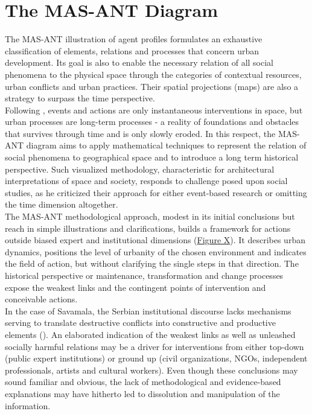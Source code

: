 \documentclass[11pt]{report}
\begin{document}
{{{\section{The MAS-ANT Diagram}

The MAS-ANT illustration of agent profiles formulates an exhaustive classification of elements, relations and processes that concern urban development.
Its goal is also to enable the necessary relation of all social phenomena to the physical space through the categories of contextual resources, urban conflicts and urban practices.
Their spatial projections (maps) are also a strategy to surpass the time perspective.
\\

Following \href{Braudel}{\cite{braudel_history_1970}}, events and actions are only instantaneous interventions in space, but urban processes are long-term processes - a reality of foundations and obstacles that survives through time and is only slowly eroded.
In this respect, the MAS-ANT diagram aims to apply mathematical  techniques to represent the  relation of social phenomena  to  geographical space and to introduce a  long term historical perspective.
Such visualized methodology, characteristic for architectural interpretations of space and society, responds to \href{Braudel}{\cite{braudel_history_1970}} challenge posed upon social studies, as he criticized their approach for either event-based research or omitting the time dimension altogether.
\\

The MAS-ANT methodological approach, modest in its initial conclusions but reach in simple illustrations and clarifications, builds a framework for actions outside biased expert and institutional dimensions (\href{Diagram}{Figure X}).
It describes urban dynamics, positions the level of urbanity of the chosen environment and indicates the field of action, but without clarifying the single steps in that direction.
The historical perspective or maintenance, transformation and change processes expose the weakest links and the contingent points of intervention and conceivable actions. 
\\

In the case of Savamala, the Serbian institutional discourse lacks mechanisms serving to translate destructive conflicts into constructive and productive elements (\href{Vujoseivc}{\citealt{vujosevic_regionalizam_2015}}).
An elaborated indication of the weakest links as well as unleashed socially harmful relations may be a driver for interventions from either top-down (public expert institutions) or ground up (civil organizations, NGOs, independent professionals, artists and cultural workers).
Even though these conclusions may sound familiar and obvious, the lack of methodological and evidence-based explanations may have hitherto led to dissolution and manipulation of the information.
\\

}}}
\end{document}
